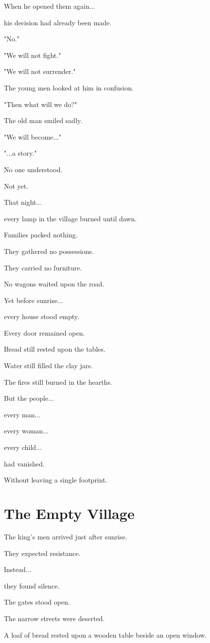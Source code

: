 \documentclass[12pt,openany]{book}
\begin{document}
When he opened them again...

his decision had already been made.

"No."

"We will not fight."

"We will not surrender."

The young men looked at him in confusion.

"Then what will we do?"

The old man smiled sadly.

"We will become..."

"...a story."

No one understood.

Not yet.

That night...

every lamp in the village burned until dawn.

Families packed nothing.

They gathered no possessions.

They carried no furniture.

No wagons waited upon the road.

Yet before sunrise...

every house stood empty.

Every door remained open.

Bread still rested upon the tables.

Water still filled the clay jars.

The fires still burned in the hearths.

But the people...

every man...

every woman...

every child...

had vanished.

Without leaving a single footprint.
\section*{The Empty Village}

The king's men arrived just after sunrise.

They expected resistance.

Instead...

they found silence.

The gates stood open.

The narrow streets were deserted.

A loaf of bread rested upon a wooden table beside an open window.
\end{document}
